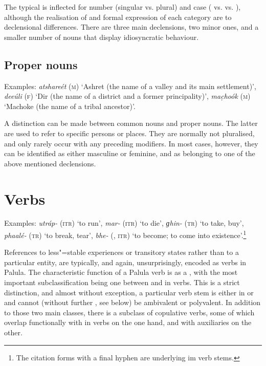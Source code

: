 The typical  is inflected for number (singular vs. plural) and case ( vs.  vs. ), although the realisation of and formal expression of each category are  to declensional differences. There are three main declensions, two minor ones, and a smaller number of nouns that display idiosyncratic  behaviour.


\subsection{Proper nouns}
\label{subsec:3b-2-1}
Examples: \textit{atshareét} (\textsc{m}) `Ashret (the name of a valley and its main settlement)', \textit{deeúli} (\textsc{f}) `Dir (the name of a district and a former principality)', \textit{mac̣hoók} (\textsc{m}) `Machoke (the name of a tribal ancestor)'.


A distinction can be made between common nouns and proper nouns. The latter are used to refer to specific persons or places. They are normally not pluralised, and only rarely occur with any preceding modifiers. In most cases, however, they can be identified as either masculine or feminine, and as belonging to one of the above mentioned declensions.

\section{Verbs}
\label{sec:3b-3}

Examples: \textit{utráp-} (\textsc{itr}) `to run', \textit{mar-} (\textsc{itr}) `to die', \textit{ɡhin-} (\textsc{tr}) `to take, buy', \textit{phaalé-} (\textsc{tr}) `to break, tear', \textit{bhe-} (, \textsc{itr}) `to become; to come into existence'.\footnote{The citation forms with a final hyphen are underlying im verb stems.}


References to less"=stable experiences or transitory states rather than to a particular entity, are typically, and again, unsurprisingly, encoded as verbs in Palula. The characteristic function of a Palula verb is as a , with the most important subclassification being one between  and in verbs. This is a strict distinction, and almost without exception, a particular verb stem is either in or  and cannot (without further , see below) be ambivalent or polyvalent. In addition to those two main classes, there is a subclass of copulative verbs, some of which overlap functionally with in verbs on the one hand, and with auxiliaries on the other.


